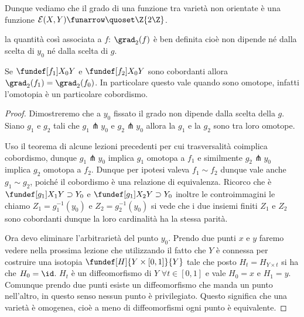 Dunque vediamo che il grado di una funzione tra varietà non orientate è una funzione $ \mathcal{E}(X, Y) \funarrow \quoset\Z{2\Z}$.

\begin{teo}
 la quantità così associata a $f$: $\grad_{2}(f)$ è ben definita cioè non dipende né dalla scelta di $y_{0}$ né dalla scelta di $g$. 
\end{teo}

\begin{teo}
 Se $\fundef[f_{1}]{X_{0}}{Y}$ e $\fundef[f_{2}]{X_{0}}{Y}$ sono cobordanti allora $\grad_{2}(f_{1}) = \grad_{2}(f_{0})$. In particolare questo vale quando sono omotope,
 infatti l'omotopia è un particolare cobordismo.
\end{teo}

\begin{proof}
 Dimostreremo che a $y_{0}$ fissato il grado non dipende dalla scelta della $g$. Siano $g_{1}$ e $g_{2}$ tali che $g_1 \pitchfork y_0$ e $g_{2} \pitchfork y_{0}$ allora la $g_1$ e la $g_2$ 
 sono tra loro omotope.
 
 
 Uso il teorema di alcune lezioni precedenti per cui trasversalità coimplica cobordismo, dunque $g_1 \pitchfork y_0$ implica $g_1$ omotopa a $f_{1}$ e similmente
  $g_2 \pitchfork y_0$ implica $g_2$ omotopa a $f_{2}$. Dunque per ipotesi valeva $f_{1} \sim f_{2}$ dunque vale anche  $g_{1} \sim g_{2}$, poiché il cobordismo è una relazione di equivalenza.
  Ricorco che è $\fundef[g_{1}]{X_{1}}{Y \supset Y_{0}}$ e $\fundef[g_{1}]{X_{2}}{Y \supset Y_{0}}$ inoltre le controimmagini le chiamo $Z_{1} = g_{1}^{-1}(y_{0})$ e $Z_{2} = g_{2}^{-1}(y_{0})$
  si vede che i due insiemi finiti $Z_{1}$ e $Z_{2}$ sono cobordanti dunque la loro cardinalità ha la stessa parità.
 
Ora devo eliminare l'arbitrarietà del punto $y_{0}$. Prendo due punti $x$ e $y$ faremo vedere nella prossima lezione che utilizzando il fatto che $Y$ è connessa per costruire una isotopia
$\fundef[H]{Y \times [0,1]}{Y}$ tale che posto $H_{t} = H_{Y \times {t}}$ si ha che $H_{0} = \id$. $H_{t}$ è un diffeomorfismo di $Y$ $\forall t \in [0,1]$  e vale $H_{0} = x$ e $H_{1} = y$.
Comunque prendo due punti esiste un diffeomorfismo che manda un punto nell'altro, in questo senso nessun punto è privilegiato. Questo significa che una varietà è omogenea, cioè a meno di 
diffeomorfismi ogni punto è equivalente.
\end{proof}



